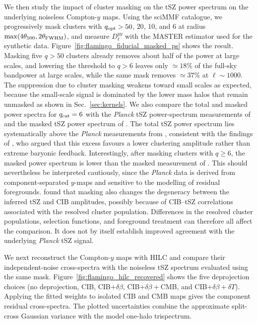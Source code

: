\documentclass[aps,prd,twocolumn,superscriptaddress,nofootinbib,floatfix]{revtex4-2}
\begin{document}
We then study the impact of cluster masking on the tSZ power spectrum on the underlying noiseless Compton-$y$ maps. Using the sciMMF catalogue, we
progressively mask clusters with $q_{\rm opt}>50$, $20$, $10$, and $6$ at radius $\max(4\theta_{500},2\theta_{\rm FWHM})$, and measure $D_\ell^{yy}$ with the MASTER estimator used for the synthetic data. Figure~\ref{fig:flamingo_fiducial_masked_ps} shows the result. Masking
five $q>50$ clusters already removes about half of the power at large scales, and lowering the threshold to $q>6$ leaves only
$\simeq18\%$ of the full-sky bandpower at large scales, while the same mask
removes $\simeq37\%$ at $\ell\sim1000$. The suppression due to cluster masking weakens toward small scales as expected, because the small-scale signal is dominated by the lower mass halos that remain unmasked as shown in Sec.~\ref{sec:kernels}. We also compare the total and masked power spectra for $q_{\rm cat}=6$ with the \textit{Planck} tSZ power-spectrum measurements of \citet{Bolliet_2018} and the masked tSZ power spectrum of \citet{Rotti_2021}. The total tSZ power spectrum lies systematically above the \textit{Planck} measurements from \citet{Bolliet_2018}, consistent with the findings of \citet{McCarthy:2023ism}, who argued that this excess favours a lower clustering amplitude rather than extreme baryonic feedback. Interestingly, after masking clusters with $q\geq6$, the masked power spectrum is lower than the masked measurement of \citet{Rotti_2021}. This should nevertheless be interpreted cautiously, since the \textit{Planck} data is derived from component-separated $y$-maps and sensitive to the modelling of residual foregrounds. \citet{Rotti_2021} found that masking also changes the degeneracy between the inferred tSZ and CIB amplitudes, possibly because of CIB--tSZ correlations associated with the resolved cluster population. Differences in the resolved cluster populations, selection functions, and foreground treatment can therefore all affect the comparison. It does not by itself establish improved agreement with the underlying \textit{Planck} tSZ signal.

We next reconstruct the Compton-$y$ maps with HILC and compare their independent-noise cross-spectra with the noiseless tSZ spectrum evaluated using the same mask. Figure~\ref{fig:flamingo_hilc_recovered} shows the five deprojection choices (no deprojection, CIB, CIB$+\delta \beta$, CIB$+\delta \beta+$CMB, and CIB$+\delta \beta + \delta T$). Applying the fitted weights to isolated CIB and CMB maps gives the component residual cross-spectra. The plotted uncertainties combine the approximate split-cross Gaussian variance with the model one-halo trispectrum.
\end{document}
